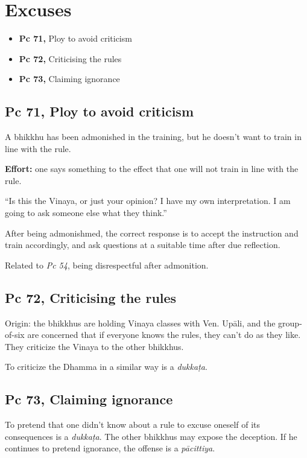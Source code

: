 \chapter{Excuses}

\begin{itemize}
\tightlist
\item
  \textbf{Pc 71,} Ploy to avoid criticism
\item
  \textbf{Pc 72,} Criticising the rules
\item
  \textbf{Pc 73,} Claiming ignorance
\end{itemize}

\section{Pc 71, Ploy to avoid criticism}

A bhikkhu has been admonished in the training, but he doesn't want to
train in line with the rule.

\textbf{Effort:} one says something to the effect that one will not
train in line with the rule.

``Is this the Vinaya, or just your opinion? I have my own
interpretation. I am going to ask someone else what they think.''

After being admonishmed, the correct response is to accept the
instruction and train accordingly, and ask questions at a suitable time
after due reflection.

Related to \emph{Pc 54}, being disrespectful after admonition.

\section{Pc 72, Criticising the rules}

Origin: the bhikkhus are holding Vinaya classes with Ven. Upāli, and the
group-of-six are concerned that if everyone knows the rules, they can't
do as they like. They criticize the Vinaya to the other bhikkhus.

To criticize the Dhamma in a similar way is a \emph{dukkaṭa}.

\section{Pc 73, Claiming ignorance}

To pretend that one didn't know about a rule to excuse oneself of its
consequences is a \emph{dukkaṭa}. The other bhikkhus may expose the
deception. If he continues to pretend ignorance, the offense is a
\emph{pācittiya}.


